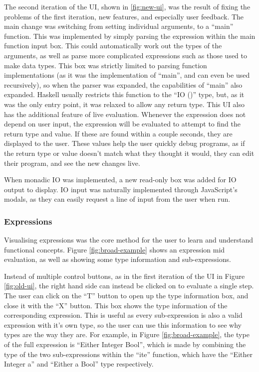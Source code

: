 The second iteration of the UI, shown in \ref{fig:new-ui}, was the result of fixing the problems of the first iteration, new features, and especially user feedback. The main change was switching from setting individual arguments, to a ``main'' function. This was implemented by simply parsing the expression within the main function input box. This could automatically work out the types of the arguments, as well as parse more complicated expressions such as those used to make data types. This box was strictly limited to parsing function implementations (as it was the implementation of ``main'', and can even be used recursively), so when the parser was expanded, the capabilities of ``main'' also expanded. Haskell usually restricts this function to the ``IO ()'' type, but, as it was the only entry point, it was relaxed to allow any return type.
This UI also has the additional feature of live evaluation. Whenever the expression does not depend on user input, the expression will be evaluated to attempt to find the return type and value. If these are found within a couple seconds, they are displayed to the user. These values help the user quickly debug programs, as if the return type or value doesn't match what they thought it would, they can edit their program, and see the new changes live. 

When monadic IO was implemented, a new read-only box was added for IO output to display. IO input was naturally implemented through JavaScript's modals, as they can easily request a line of input from the user when run.

\subsubsection{Expressions}
Visualising expressions was the core method for the user to learn and understand functional concepts. Figure \ref{fig:broad-example} shows an expression mid evaluation, as well as showing some type information and sub-expressions.

Instead of multiple control buttons, as in the first iteration of the UI in Figure \ref{fig:old-ui}, the right hand side can instead be clicked on to evaluate a single step. The user can click on the ``T'' button to open up the type information box, and close it with the ``X'' button. This box shows the type information of the corresponding expression. This is useful as every sub-expression is also a valid expression with it's own type, so the user can use this information to see why types are the way they are. For example, in Figure \ref{fig:broad-example}, the type of the full expression is ``Either Integer Bool'', which is made by combining the type of the two sub-expressions within the ``ite'' function, which have the ``Either Integer a'' and ``Either a Bool'' type respectively.

